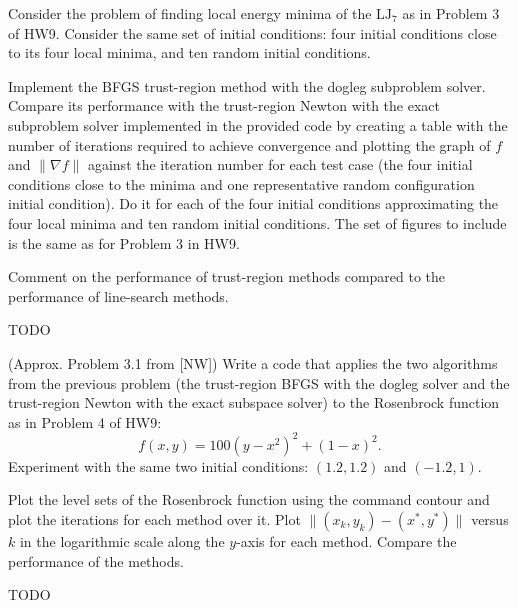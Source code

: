 \documentclass{../kin_math}
\begin{document}
\begin{questions}
  \question Consider the problem of finding local energy minima of the $\text{LJ}_7$ as in Problem 3 of HW9. Consider the same set of initial conditions: four initial conditions close to its four local minima, and ten random initial conditions.

  Implement the BFGS trust-region method with the dogleg subproblem solver. Compare its performance with the trust-region Newton with the exact subproblem solver implemented in the provided code by creating a table with the number of iterations required to achieve convergence and plotting the graph of $f$ and $\lVert \nabla f \rVert$ against the iteration number for each test case (the four initial conditions close to the minima and one representative random configuration initial condition). Do it for each of the four initial conditions approximating the four local minima and ten random initial conditions. The set of figures to include is the same as for Problem 3 in HW9.

  Comment on the performance of trust-region methods compared to the performance of line-search methods.
  \begin{solution}
    TODO
  \end{solution}

  \question (Approx. Problem 3.1 from [NW]) Write a code that applies the two algorithms from the previous problem (the trust-region BFGS with the dogleg solver and the trust-region Newton with the exact subspace solver) to the Rosenbrock function as in Problem 4 of HW9:
  \begin{equation}
    f(x, y) = 100(y - x^2)^2 + (1 - x)^2.
  \end{equation}
  Experiment with the same two initial conditions: $(1.2, 1.2)$ and $(-1.2, 1)$.

  Plot the level sets of the Rosenbrock function using the command contour and plot the iterations for each method over it. Plot $\lVert (x_k, y_k) - (x^*, y^*) \rVert$ versus $k$ in the logarithmic scale along the $y$-axis for each method. Compare the performance of the methods.
  \begin{solution}
    TODO
  \end{solution}
\end{questions}
\end{document}
